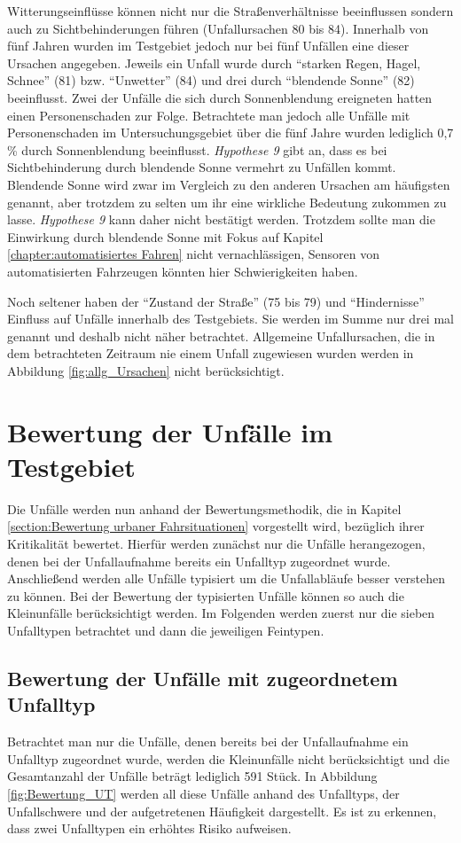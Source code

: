 Witterungseinflüsse können nicht nur die Straßenverhältnisse beeinflussen sondern auch zu Sichtbehinderungen führen (Unfallursachen 80 bis 84). Innerhalb von fünf Jahren wurden im Testgebiet jedoch nur bei fünf Unfällen eine dieser Ursachen angegeben. Jeweils ein Unfall wurde durch \enquote{starken Regen, Hagel, Schnee} (81) bzw. \enquote{Unwetter} (84) und drei durch \enquote{blendende Sonne} (82) beeinflusst. Zwei der Unfälle die sich durch Sonnenblendung ereigneten hatten einen Personenschaden zur Folge. Betrachtete man jedoch alle Unfälle mit Personenschaden im Untersuchungsgebiet über die fünf Jahre wurden lediglich 0,7 \% durch Sonnenblendung beeinflusst. \textit{Hypothese 9} gibt an, dass es bei Sichtbehinderung durch blendende Sonne vermehrt zu Unfällen kommt. Blendende Sonne wird zwar im Vergleich zu den anderen Ursachen am häufigsten genannt, aber trotzdem zu selten um ihr eine wirkliche Bedeutung zukommen zu lasse. \textit{Hypothese 9} kann daher nicht bestätigt werden. Trotzdem sollte man die Einwirkung durch blendende Sonne mit Fokus auf Kapitel \ref{chapter:automatisiertes Fahren} nicht vernachlässigen, Sensoren von automatisierten Fahrzeugen könnten hier Schwierigkeiten haben.
 
Noch seltener haben der \enquote{Zustand der Straße} (75 bis 79) und \enquote{Hindernisse} Einfluss auf Unfälle innerhalb des Testgebiets. Sie werden im Summe nur drei mal genannt und deshalb nicht näher betrachtet. Allgemeine Unfallursachen, die in dem betrachteten Zeitraum nie einem Unfall zugewiesen wurden werden in Abbildung \ref{fig:allg_Ursachen} nicht berücksichtigt.


\section{Bewertung der Unfälle im Testgebiet}
Die Unfälle werden nun anhand der Bewertungsmethodik, die in Kapitel \ref{section:Bewertung urbaner Fahrsituationen} vorgestellt wird, bezüglich ihrer Kritikalität bewertet. Hierfür werden zunächst nur die Unfälle herangezogen, denen bei der Unfallaufnahme bereits ein Unfalltyp zugeordnet wurde. Anschließend werden alle Unfälle typisiert um die Unfallabläufe besser verstehen zu können. Bei der Bewertung der typisierten Unfälle können so auch die Kleinunfälle berücksichtigt werden. Im Folgenden werden zuerst nur die sieben Unfalltypen betrachtet und dann die jeweiligen Feintypen.

\subsection{Bewertung der Unfälle mit zugeordnetem Unfalltyp}
Betrachtet man nur die Unfälle, denen bereits bei der Unfallaufnahme ein Unfalltyp zugeordnet wurde, werden die Kleinunfälle nicht berücksichtigt und die Gesamtanzahl der Unfälle beträgt lediglich 591 Stück. In Abbildung \ref{fig:Bewertung_UT} werden all diese Unfälle anhand des Unfalltyps, der Unfallschwere und der aufgetretenen Häufigkeit dargestellt. Es ist zu erkennen, dass zwei Unfalltypen ein erhöhtes Risiko aufweisen.

